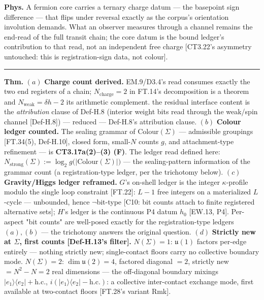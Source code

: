 \begin{theorem}
\textbf{Phys.} A fermion core carries a ternary charge datum — the basepoint sign difference — that flips under reversal exactly as the corpus's orientation involution demands. What an observer measures through a channel remains the end-read of the full transit chain; the core datum is the bound ledger's contribution to that read, not an independent free charge [CT3.22's asymmetry untouched: this is registration-sign data, not colour].

\vspace{2pt}\noindent\rule{\textwidth}{0.4pt}\vspace{2pt}

\end{theorem}

\begin{theorem}\label{tag:FT-41}
\textbf{Thm.} $(a)$ \textbf{Charge count derived.} EM.9/D3.4's read consumes exactly the two end registers of a chain; $N_{\mathrm{charge}}=2$ in FT.14's decomposition is a theorem and $N_{\mathrm{weak}}=\delta h-2$ its arithmetic complement. the residual interface content is the \textit{attribution} clause of Def-H.8 (interior weight bits read through the weak/spin channel [Def-H.8]) — reduced — Def-H.8's attribution clause. $(b)$ \textbf{Colour ledger counted.} The sealing grammar of $\mathrm{Colour}(\Sigma)$ — admissible groupings [FT.34(5), Def-H.10], closed form, small-$N$ counts $g$, and attachment-type refinement — is \textbf{CT3.17a(2)–(3) (F)}. The ledger read defined here: $N_{\mathrm{strong}}(\Sigma):=\log_2 g\bigl(|\mathrm{Colour}(\Sigma)|\bigr)$ — the sealing-pattern information of the grammar count (a registration-type ledger, per the trichotomy below). $(c)$ \textbf{Gravity/Higgs ledger reframed.} $G$'s on-shell ledger is the integer $\kappa$-profile modulo the single loop constraint [FT.22]: $L-1$ free integers on a materialized $L$-cycle — unbounded, hence $\neg$bit-type [C10: bit counts attach to finite registered alternative sets]; $H$'s ledger is the continuous P4 datum $h_0$ [EW.13, P4]. Per-aspect "bit counts" are well-posed exactly for the registration-type ledgers $(a),(b)$ — the trichotomy answers the original question. $(d)$ \textbf{Strictly new at $\Sigma$, first counts [Def-H.13's filter].} $N(\Sigma)=1$: $\mathfrak u(1)$ factors per-edge entirely — nothing strictly new; single-contact floors carry no collective boundary mode. $N(\Sigma)=2$: $\dim\mathfrak u(2)=4$, factored diagonal $=2$, strictly new $=N^2-N=2$ real dimensions — the off-diagonal boundary mixings $|e_1\rangle\langle e_2|+\mathrm{h.c.}$, $i(|e_1\rangle\langle e_2|-\mathrm{h.c.})$: a collective inter-contact exchange mode, first available at two-contact floors [FT.28's variant Rmk].


\end{theorem}
